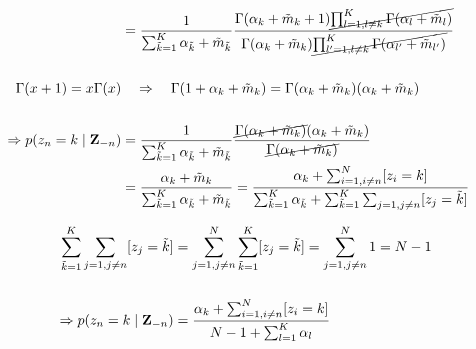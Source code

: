 \begin{enumerate}
\begin{align*}
       \\
       &= \frac{1}{\sum_{\Tilde{k}=1}^K \alpha_{\tilde{k}} + \tilde{m}_{\tilde{k}}} \frac{\Gamma(\alpha_k + \Tilde{m}_k + 1)\cancel{\prod_{l=1, l\neq k}^K\Gamma(\alpha_l + \Tilde{m}_l)}}{\Gamma(\alpha_k + \Tilde{m}_k) \cancel{\prod_{l'=1, l\neq k}^K\Gamma(\alpha_{l'} + \Tilde{m}_{l'})} } 
       \\\\
       \Gamma(x + 1) = x\Gamma(x) &\quad\Rightarrow\quad \Gamma(1 + \alpha_k + \Tilde{m}_k) = \Gamma(\alpha_k + \Tilde{m}_k)(\alpha_k + \Tilde{m}_k) 
       \\\\
       \Rightarrow p(z_n = k \mid \mathbf{Z}_{-n}) &= \frac{1}{\sum_{\Tilde{k}=1}^K \alpha_{\tilde{k}} + \tilde{m}_{\tilde{k}}} \frac{\cancel{\Gamma(\alpha_k + \Tilde{m}_k)}(\alpha_k + \Tilde{m}_k)}{\cancel{\Gamma(\alpha_k + \Tilde{m}_k)}}
       \\
       &= \frac{\alpha_k + \Tilde{m}_k}{\sum_{\Tilde{k}=1}^K \alpha_{\tilde{k}} + \Tilde{m}_{\tilde{k}}} = \frac{\alpha_k + \sum_{i=1, i \neq n}^N[z_i = k]}{\sum_{\Tilde{k}=1}^K \alpha_{\tilde{k}} + \sum_{\Tilde{k}=1}^K\sum_{j=1, j\neq n}[z_j= {\tilde{k}}]}
   \end{align*}
   
   \begin{align*}
       \sum_{\Tilde{k}=1}^K\sum_{j=1, j\neq n}[z_j= \tilde{k}] &= \sum_{j=1, j\neq n}^N \sum_{\Tilde{k}=1}^K [z_j = \tilde{k}] = \sum_{j=1, j\neq n}^N 1 = N - 1
       \\\\
       \Rightarrow p(z_n = k \mid \mathbf{Z}_{-n}) &= \frac{\alpha_k + \sum_{i=1, i \neq n}^N[z_i = k]}{N - 1 + \sum_{l=1}^K \alpha_l}
    \end{align*}
   

\end{enumerate}
